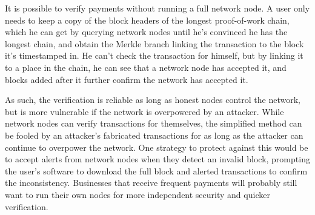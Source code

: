 It is possible to verify payments without running a full network node. A user only needs to keep a copy of the block headers of the longest proof-of-work chain, which he can get by querying network nodes until he's convinced he has the longest chain, and obtain the Merkle branch linking the transaction to the block it's timestamped in. He can't check the transaction for himself, but by linking it to a place in the chain, he can see that a network node has accepted it, and blocks added after it further confirm the network has accepted it.

As such, the verification is reliable as long as honest nodes control the network, but is more vulnerable if the network is overpowered by an attacker. While network nodes can verify transactions for themselves, the simplified method can be fooled by an attacker's fabricated transactions for as long as the attacker can continue to overpower the network. One strategy to protect against this would be to accept alerts from network nodes when they detect an invalid block, prompting the user's software to download the full block and alerted transactions to confirm the inconsistency. Businesses that receive frequent payments will probably still want to run their own nodes for more independent security and quicker verification.